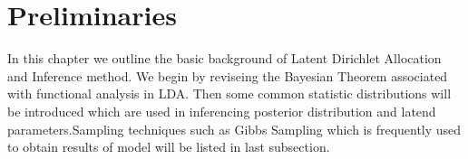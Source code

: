 \chapter{Preliminaries}
In this chapter we outline the basic background of Latent Dirichlet Allocation and Inference method. We begin by reviseing the Bayesian Theorem
associated with functional analysis in LDA. Then some common statistic distributions
 will be introduced which are used in inferencing posterior distribution and latend parameters.Sampling techniques such as Gibbs Sampling which is frequently used to obtain results of model will be listed in last subsection.
